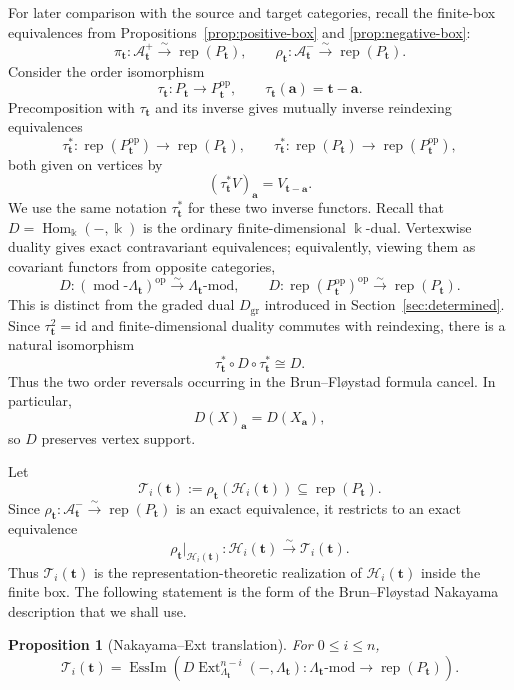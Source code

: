 \documentclass[10pt,a4paper]{amsart}
\newtheorem{proposition}[theorem]{Proposition}
\newcommand{\Rep}{\operatorname{rep}}
\newcommand{\Hom}{\operatorname{Hom}}
\newcommand{\Ext}{\operatorname{Ext}}
\newcommand{\EssIm}{\operatorname{EssIm}}
\newcommand{\modcat}{\operatorname{mod}}
\newcommand{\Dgr}{D_{\mathrm{gr}}}
\begin{document}
For later comparison with the source and target categories, recall the
finite-box equivalences from Propositions~\ref{prop:positive-box} and
\ref{prop:negative-box}:
\[
\pi_{\mathbf t}:\mathcal A^+_{\mathbf t}\xrightarrow{\sim}\Rep(P_{\mathbf t}),
\qquad
\rho_{\mathbf t}:\mathcal A^-_{\mathbf t}\xrightarrow{\sim}\Rep(P_{\mathbf t}).
\]
Consider the order isomorphism
\[
\tau_{\mathbf t}:P_{\mathbf t}\longrightarrow P_{\mathbf t}^{\mathrm{op}},
\qquad
\tau_{\mathbf t}(\mathbf a)=\mathbf t-\mathbf a.
\]
Precomposition with $\tau_{\mathbf t}$ and its inverse gives mutually inverse
reindexing equivalences
\[
\tau_{\mathbf t}^*: \Rep(P_{\mathbf t}^{\mathrm{op}})
\longrightarrow \Rep(P_{\mathbf t}),
\qquad
\tau_{\mathbf t}^*: \Rep(P_{\mathbf t})
\longrightarrow \Rep(P_{\mathbf t}^{\mathrm{op}}),
\]
both given on vertices by
$$(\tau_{\mathbf t}^*V)_{\mathbf a}=V_{\mathbf t-\mathbf a}.$$
We use the same notation $\tau_{\mathbf t}^*$ for these two inverse functors.
Recall that
$D=\Hom_\Bbbk(-,\Bbbk)$ is the ordinary finite-dimensional $\Bbbk$-dual.  Vertexwise duality gives exact contravariant equivalences; equivalently,
viewing them as covariant functors from opposite categories,
\[
D:(\modcat\text{-}\Lambda_{\mathbf t})^{\mathrm{op}}
\xrightarrow{\sim}
\Lambda_{\mathbf t}\text{-mod},
\qquad
D:\Rep(P_{\mathbf t}^{\mathrm{op}})^{\mathrm{op}}
\xrightarrow{\sim}
\Rep(P_{\mathbf t}).
\]
This is distinct from the graded dual $\Dgr$ introduced in Section~\ref{sec:determined}.  Since $\tau_{\mathbf t}^2=\mathrm{id}$ and finite-dimensional duality commutes with reindexing, there is a natural isomorphism
\[
\tau_{\mathbf t}^*\circ D\circ\tau_{\mathbf t}^*\cong D.
\]
Thus the two order reversals occurring in the Brun--Fl\o ystad formula cancel.  In particular,
\[
D(X)_{\mathbf a}=D(X_{\mathbf a}),
\]
so $D$ preserves vertex support.

Let
\[
\mathcal T_i(\mathbf t):=\rho_{\mathbf t}(\mathcal H_i(\mathbf t))
\subseteq\Rep(P_{\mathbf t}).
\]
Since $\rho_{\mathbf t}:\mathcal A^-_{\mathbf t}\xrightarrow{\sim}\Rep(P_{\mathbf t})$
is an exact equivalence, it restricts to an exact equivalence
\[
\rho_{\mathbf t}|_{\mathcal H_i(\mathbf t)}:
\mathcal H_i(\mathbf t)\xrightarrow{\sim}\mathcal T_i(\mathbf t).
\]
Thus $\mathcal T_i(\mathbf t)$ is the representation-theoretic realization of
$\mathcal H_i(\mathbf t)$ inside the finite box.  The following statement is
the form of the Brun--Fl\o ystad Nakayama description that we shall use.

\begin{proposition}[Nakayama--Ext translation]\label{prop:naka-ext}
For $0\le i\le n$,
\[
\mathcal T_i(\mathbf t)
=
\EssIm\left(
D\Ext^{n-i}_{\Lambda_{\mathbf t}}(-,\Lambda_{\mathbf t})
:\Lambda_{\mathbf t}\text{-mod}\longrightarrow\Rep(P_{\mathbf t})
\right).
\]
\end{proposition}
\end{document}
